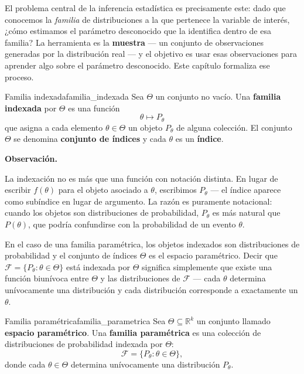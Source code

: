 \documentclass[12pt, a4paper]{book}
\newenvironment{observacion}{%
    \par\medskip\noindent\textbf{\color{azul}Observaci\'{o}n.}\enspace\itshape
}{\par\medskip}
\numberwithin{equation}{chapter}
\begin{document}
El problema central de la inferencia estadística es precisamente
este: dado que conocemos la \emph{familia} de distribuciones a
la que pertenece la variable de interés, ¿cómo estimamos el
parámetro desconocido que la identifica dentro de esa familia?
La herramienta es la \textbf{muestra} --- un conjunto de
observaciones generadas por la distribución real --- y el
objetivo es usar esas observaciones para aprender algo sobre el
parámetro desconocido. Este capítulo formaliza ese proceso.

\begin{definicion}{Familia indexada}{familia_indexada}
	Sea $\Theta$ un conjunto no vacío. Una \textbf{familia
		indexada} por $\Theta$ es una función
	\[
	\theta \mapsto P_\theta
	\]
	que asigna a cada elemento $\theta \in \Theta$ un objeto
	$P_\theta$ de alguna colección. El conjunto $\Theta$ se
	denomina \textbf{conjunto de índices} y cada $\theta$ es
	un \textbf{índice}.
\end{definicion}

\begin{observacion}
	La indexación no es más que una función con notación
	distinta. En lugar de escribir $f(\theta)$ para el
	objeto asociado a $\theta$, escribimos $P_\theta$ ---
	el índice aparece como subíndice en lugar de argumento.
	La razón es puramente notacional: cuando los objetos
	son distribuciones de probabilidad, $P_\theta$ es más
	natural que $P(\theta)$, que podría confundirse con
	la probabilidad de un evento $\theta$.
	
	En el caso de una familia paramétrica, los objetos
	indexados son distribuciones de probabilidad y el
	conjunto de índices $\Theta$ es el espacio paramétrico.
	Decir que $\mathcal{F} = \{P_\theta : \theta \in
	\Theta\}$ está indexada por $\Theta$ significa
	simplemente que existe una función biunívoca entre
	$\Theta$ y las distribuciones de $\mathcal{F}$ ---
	cada $\theta$ determina unívocamente una distribución
	y cada distribución corresponde a exactamente un
	$\theta$.
\end{observacion}

\begin{definicion}{Familia param\'{e}trica}{familia_parametrica}
	Sea $\Theta \subseteq \mathbb{R}^k$ un conjunto llamado
	\textbf{espacio param\'{e}trico}. Una \textbf{familia
		param\'{e}trica} es una colección de distribuciones de
	probabilidad indexada por $\Theta$:
	\[
	\mathcal{F} = \{P_\theta : \theta \in \Theta\},
	\]
	donde cada $\theta \in \Theta$ determina unívocamente una
	distribución $P_\theta$.
\end{definicion}
\end{document}
